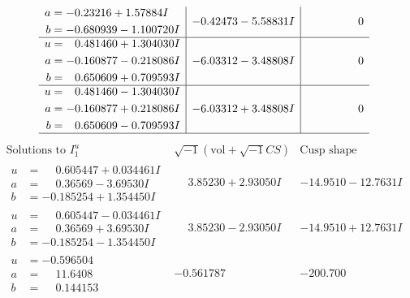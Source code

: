 \documentclass[1p]{elsarticle_modified}
\theoremstyle{definition}
\newcommand{\I}{\sqrt{-1}}
\begin{document}
$$\begin{array}{c|c|c}
\begin{aligned}
a &= -0.23216 + 1.57884 I \\
b &= -0.680939 - 1.100720 I\end{aligned}
 & -0.42473 - 5.58831 I & \phantom{-0.000000 } 0 \\ \hline\begin{aligned}
u &= \phantom{-}0.481460 + 1.304030 I \\
a &= -0.160877 - 0.218086 I \\
b &= \phantom{-}0.650609 + 0.709593 I\end{aligned}
 & -6.03312 - 3.48808 I & \phantom{-0.000000 } 0 \\ \hline\begin{aligned}
u &= \phantom{-}0.481460 - 1.304030 I \\
a &= -0.160877 + 0.218086 I \\
b &= \phantom{-}0.650609 - 0.709593 I\end{aligned}
 & -6.03312 + 3.48808 I & \phantom{-0.000000 } 0\\
 \hline 
 \end{array}$$\newpage$$\begin{array}{c|c|c}  
\text{Solutions to }I^u_{1}& \I (\text{vol} + \sqrt{-1}CS) & \text{Cusp shape}\\
 \hline 
\begin{aligned}
u &= \phantom{-}0.605447 + 0.034461 I \\
a &= \phantom{-}0.36569 - 3.69530 I \\
b &= -0.185254 + 1.354450 I\end{aligned}
 & \phantom{-}3.85230 + 2.93050 I & -14.9510 - 12.7631 I \\ \hline\begin{aligned}
u &= \phantom{-}0.605447 - 0.034461 I \\
a &= \phantom{-}0.36569 + 3.69530 I \\
b &= -0.185254 - 1.354450 I\end{aligned}
 & \phantom{-}3.85230 - 2.93050 I & -14.9510 + 12.7631 I \\ \hline\begin{aligned}
u &= -0.596504\phantom{ +0.000000I} \\
a &= \phantom{-}11.6408\phantom{ +0.000000I} \\
b &= \phantom{-}0.144153\phantom{ +0.000000I}\end{aligned}
 & -0.561787\phantom{ +0.000000I} & -200.700\phantom{ +0.000000I} \\ \hline\begin{aligned}

\end{aligned}
\end{array}$$
\end{document}
